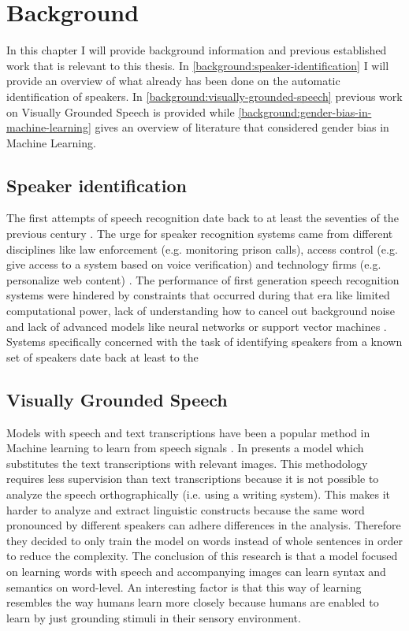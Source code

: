 \documentclass[a4paper, oneside]{book}
\begin{document}
\chapter{Background}\label{chapter:background}

In this chapter I will provide background information and previous established work that is relevant to this thesis. In \autoref{background:speaker-identification} I will provide an overview of what already has been done on the automatic identification of speakers. In \autoref{background:visually-grounded-speech} previous work on Visually Grounded Speech is provided while \autoref{background:gender-bias-in-machine-learning} gives an overview of literature that considered gender bias in Machine Learning.

\section{Speaker identification}\label{background:speaker-identification}
The first attempts of speech recognition date back to at least the seventies of the previous century \cite{huang2014historical}. The urge for speaker recognition systems came from different disciplines like law enforcement (e.g. monitoring prison calls), access control (e.g. give access to a system based on voice verification) and technology firms (e.g. personalize web content)  \cite{reynolds2002overview}. The performance of first generation speech recognition systems were hindered by constraints that occurred during that era like limited computational power, lack of understanding how to cancel out background noise and lack of advanced models like neural networks or support vector machines \cite{huang2014historical}. \\

Systems specifically concerned with the task of identifying speakers from a known set of speakers date back at least to the 

\section{Visually Grounded Speech}\label{background:visually-grounded-speech}
Models with speech and text transcriptions have been a popular method in Machine learning to learn from speech signals \cite{HarwathG15}. In \cite{HarwathG15} presents a model which substitutes the text transcriptions with relevant images. This methodology requires less supervision than text transcriptions because it is not possible to analyze the speech orthographically (i.e. using a writing system). This makes it harder to analyze and extract linguistic constructs because the same word pronounced by different speakers can adhere differences in the analysis. Therefore they decided to only train the model on words instead of whole sentences in order to reduce the complexity. The conclusion of this research is that a model focused on learning words with speech and accompanying images can learn syntax and semantics on word-level. An interesting factor is that this way of learning resembles the way humans learn more closely because humans are enabled to learn by just grounding stimuli in their sensory environment. \\
\end{document}

